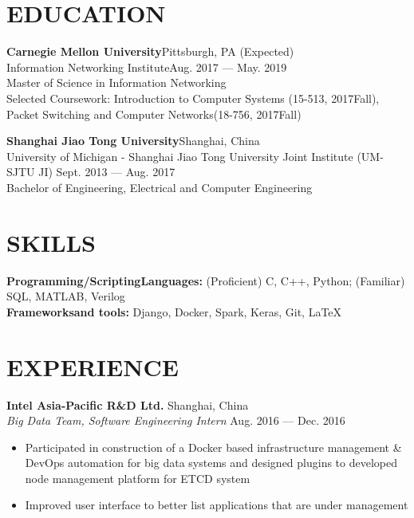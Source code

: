 \documentclass[margin,line,10pt]{res}
\begin{document}
\address{ $\bullet$ linkedin.com/in/hao-wu-710254128 $\bullet$ wu.hao.cz.21@gmail.com $\bullet$ (412)-616-6280}
 
\begin{resume}

\section{EDUCATION}
{
\small
\textbf{Carnegie Mellon University}\hfill Pittsburgh, PA (Expected) \\ Information Networking Institute\hfill Aug. 2017 --- May. 2019\\
Master of Science in Information Networking\\
{\small Selected Coursework: Introduction to Computer Systems (15-513, 2017Fall), Packet Switching and Computer Networks(18-756, 2017Fall)} 
}

{
\small
\textbf{Shanghai Jiao Tong University}\hfill Shanghai, China \\
University of Michigan - Shanghai Jiao Tong University Joint Institute (UM-SJTU JI) \hfill Sept. 2013 --- Aug. 2017\\
Bachelor of Engineering, Electrical and Computer Engineering
}

\section{SKILLS}
{\small \textbf{Programming/ScriptingLanguages:} (Proficient) C, C++, Python; (Familiar) SQL, MATLAB, Verilog}\\
{\small \textbf{Frameworksand tools:} Django, Docker, Spark, Keras, Git, \LaTeX}

\section{EXPERIENCE}
{\small
{\bf\normalsize Intel Asia-Pacific R\&D Ltd.} \hfill Shanghai, China \\
{\it Big Data Team, Software Engineering Intern} \hfill Aug. 2016 --- Dec. 2016
}
\begin{itemize}
\setlength{\itemsep}{0pt}
\setlength{\parskip}{0pt}
\setlength{\parsep}{0pt}
\item {\small Participated in construction of a Docker based infrastructure management \& DevOps automation for big data systems and designed plugins to developed node management platform for ETCD system}
\item {\small Improved user interface to better list applications that are under management}
\end{itemize}


\end{resume}
\end{document}
